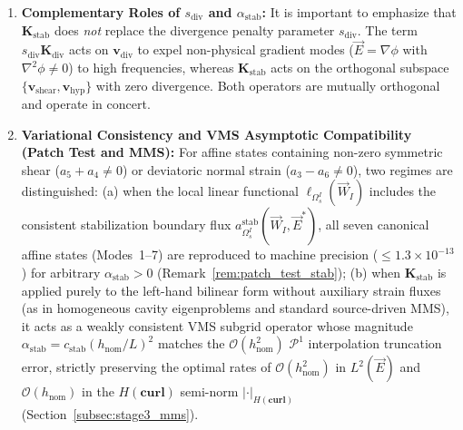 \documentclass[VANCOUVER,Times1COL]{WileyNJD-v5}
\begin{document}
\begin{enumerate}
          \begin{equation}
              \begin{aligned}
                  (\mathbf{v}_{\mathrm{shear}}^I \cdot \mathbf{u}_I)^2 + (\mathbf{v}_{\mathrm{hyp}}^I \cdot \mathbf{u}_I)^2 & = (\partial_x E_y^h + \partial_y E_x^h)^2 + (\partial_x E_x^h - \partial_y E_y^h)^2 \\
                                                                                                                            & = 2 \, \|\operatorname{dev}\boldsymbol{\varepsilon}(\vec{E}^h)\|_F^2,
              \end{aligned}
          \end{equation}
          where $\operatorname{dev}\boldsymbol{\varepsilon}(\vec{E}^h) = \boldsymbol{\varepsilon}(\vec{E}^h) - \frac{1}{2}(\nabla \cdot \vec{E}^h)\mathbf{I}_2$ is the symmetric traceless (deviatoric) gradient tensor and $\|\cdot\|_F$ is the Frobenius norm. Consequently, $\mathbf{K}_{I, \mathrm{stab}}^{\mathrm{local}}$ is strictly isotropic and objective with respect to arbitrary rotations of the global coordinate system.
    \item \textbf{Complementary Roles of $s_{\mathrm{div}}$ and $\alpha_{\mathrm{stab}}$:} It is important to emphasize that $\mathbf{K}_{\mathrm{stab}}$ does \emph{not} replace the divergence penalty parameter $s_{\mathrm{div}}$. The term $s_{\mathrm{div}} \mathbf{K}_{\mathrm{div}}$ acts on $\mathbf{v}_{\mathrm{div}}$ to expel non-physical gradient modes ($\vec{E} = \nabla\phi$ with $\nabla^2\phi \ne 0$) to high frequencies, whereas $\mathbf{K}_{\mathrm{stab}}$ acts on the orthogonal subspace $\{\mathbf{v}_{\mathrm{shear}}, \mathbf{v}_{\mathrm{hyp}}\}$ with zero divergence. Both operators are mutually orthogonal and operate in concert.
    \item \textbf{Variational Consistency and VMS Asymptotic Compatibility (Patch Test and MMS):} For affine states containing non-zero symmetric shear ($a_5 + a_4 \ne 0$) or deviatoric normal strain ($a_3 - a_6 \ne 0$), two regimes are distinguished: (a) when the local linear functional $\ell_{\Omega_s^I}(\vec{W}_I)$ includes the consistent stabilization boundary flux $a_{\Omega_s^I}^{\mathrm{stab}}(\vec{W}_I, \vec{E}^*)$, all seven canonical affine states (Modes~1--7) are reproduced to machine precision ($\le 1.3 \times 10^{-13}$) for arbitrary $\alpha_{\mathrm{stab}} > 0$ (Remark~\ref{rem:patch_test_stab}); (b) when $\mathbf{K}_{\mathrm{stab}}$ is applied purely to the left-hand bilinear form without auxiliary strain fluxes (as in homogeneous cavity eigenproblems and standard source-driven MMS), it acts as a weakly consistent VMS subgrid operator whose magnitude $\alpha_{\mathrm{stab}} = c_{\mathrm{stab}} (h_{\mathrm{nom}}/L)^2$ matches the $\mathcal{O}(h_{\mathrm{nom}}^2)$ $\mathcal{P}^1$ interpolation truncation error, strictly preserving the optimal rates of $\mathcal{O}(h_{\mathrm{nom}}^2)$ in $L^2(\vec{E})$ and $\mathcal{O}(h_{\mathrm{nom}})$ in the $H(\mathbf{curl})$ semi-norm $|\cdot|_{H(\mathbf{curl})}$ (Section~\ref{subsec:stage3_mms}).

\end{enumerate}
\end{document}
